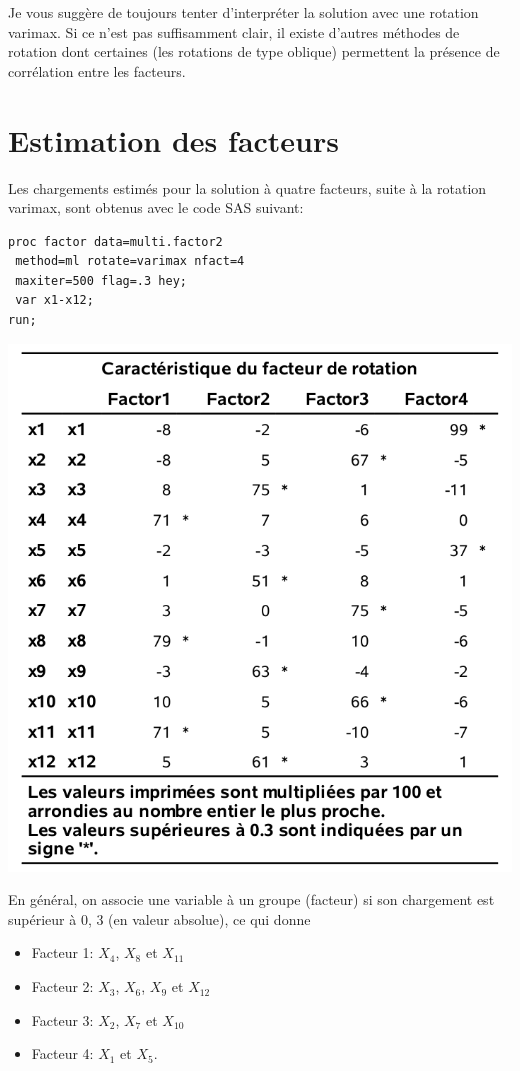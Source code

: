 \documentclass[
  11pt,
  letterpaper,
]{book}
\providecommand{\tightlist}{%
  \setlength{\itemsep}{0pt}\setlength{\parskip}{0pt}}
\theoremstyle{definition}
\theoremstyle{definition}
\theoremstyle{definition}
\theoremstyle{remark}
\begin{document}
Je vous suggère de toujours tenter d'interpréter la solution avec une rotation varimax. Si ce n'est pas suffisamment clair, il existe d'autres méthodes de rotation dont certaines (les rotations de type oblique) permettent la présence de corrélation entre les facteurs.

\hypertarget{estimation-des-facteurs}{%
\section{Estimation des facteurs}\label{estimation-des-facteurs}}

Les chargements estimés pour la solution à quatre facteurs, suite à la rotation varimax, sont obtenus avec le code SAS suivant:

\begin{verbatim}
proc factor data=multi.factor2 
 method=ml rotate=varimax nfact=4
 maxiter=500 flag=.3 hey;
 var x1-x12;
run;
\end{verbatim}

\begin{center}\includegraphics[width=0.7\linewidth]{figures/01-facto-e3} \end{center}

En général, on associe une variable à un groupe (facteur) si son chargement est supérieur à 0, 3 (en valeur absolue), ce qui donne

\begin{itemize}
\tightlist
\item
  Facteur 1: \(X_4\), \(X_8\) et \(X_{11}\)
\item
  Facteur 2: \(X_3\), \(X_6\), \(X_9\) et \(X_{12}\)
\item
  Facteur 3: \(X_2\), \(X_7\) et \(X_{10}\)
\item
  Facteur 4: \(X_1\) et \(X_5\).
\end{itemize}
\end{document}
